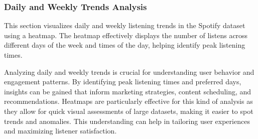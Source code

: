 \documentclass[
]{article}
\begin{document}
\subsubsection{Daily and Weekly Trends
Analysis}\label{daily-and-weekly-trends-analysis}

This section visualizes daily and weekly listening trends in the Spotify
dataset using a heatmap. The heatmap effectively displays the number of
listens across different days of the week and times of the day, helping
identify peak listening times.

Analyzing daily and weekly trends is crucial for understanding user
behavior and engagement patterns. By identifying peak listening times
and preferred days, insights can be gained that inform marketing
strategies, content scheduling, and recommendations. Heatmaps are
particularly effective for this kind of analysis as they allow for quick
visual assessments of large datasets, making it easier to spot trends
and anomalies. This understanding can help in tailoring user experiences
and maximizing listener satisfaction.
\end{document}
